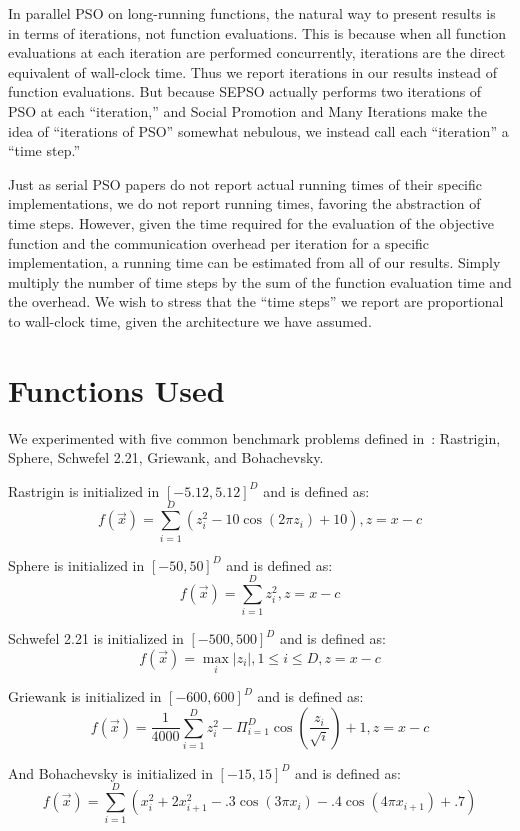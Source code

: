 \documentclass[ms,electronic,twosidetoc,letterpaper,chaptercenter,parttop,equalmargins]{byumsphd}
\begin{document}
In parallel PSO on long-running functions, the natural way to present results
is in terms of iterations, not function evaluations.  This is because when all
function evaluations at each iteration are performed concurrently, iterations
are the direct equivalent of wall-clock time.  Thus we report iterations in our
results instead of function evaluations.  But because SEPSO actually performs
two iterations of PSO at each ``iteration,'' and Social Promotion and Many
Iterations make the idea of ``iterations of PSO'' somewhat nebulous, we instead
call each ``iteration'' a ``time step.''

Just as serial PSO papers do not report actual running times of their specific
implementations, we do not report running times, favoring the abstraction of
time steps.  However, given the time required for the evaluation of the
objective function and the communication overhead per iteration for a specific
implementation, a running time can be estimated from all of our results.
Simply multiply the number of time steps by the sum of the function evaluation
time and the overhead.  We wish to stress that the ``time steps'' we report are
proportional to wall-clock time, given the architecture we have assumed.

\section{Functions Used}

We experimented with five common benchmark problems defined
in~\citep{herrera-2010-test-suite}: Rastrigin, Sphere, Schwefel 2.21, Griewank,
and Bohachevsky.

Rastrigin is initialized in $[-5.12,5.12]^D$ and is defined as:
\[f(\Vec{x}) = \sum_{i=1}^D\left(z_i^2 - 10\cos\left(2\pi z_i\right) +
10\right), z=x-c\]

Sphere is initialized in $[-50,50]^D$ and is defined as:
\[f(\Vec{x}) = \sum_{i=1}^D z_i^2, z=x-c\]

Schwefel 2.21 is initialized in $[-500,500]^D$ and is defined as:
\[f(\Vec{x}) = \max_i{|z_i|, 1 \leq i \leq D}, z=x-c\]

Griewank is initialized in $[-600,600]^D$ and is defined as:
\[f(\Vec{x}) = \frac{1}{4000}\sum_{i=1}^D z_i^2 - \Pi_{i=1}^D
\cos\left(\frac{z_i}{\sqrt{i}} \right) + 1, z=x-c\]

And Bohachevsky is initialized in $[-15,15]^D$ and is defined as:
\[f(\Vec{x}) = \sum_{i=1}^D(x_i^2+2x_{i+1}^2-.3\cos(3\pi x_i)-.4\cos(4\pi
x_{i+1})+.7)\]
\end{document}
